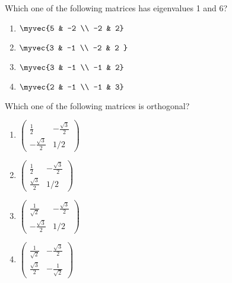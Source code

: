 \item Which one of the following matrices has eigenvalues 1 and 6? \hfill{}
\begin{multicols}{4}
\begin{enumerate}
\item $\myvec {5 & -2 \\ -2 & 2}$
\item $\myvec{3 & -1 \\ -2 & 2 }$
\item $\myvec{3 & -1 \\ -1 & 2}$
\item $\myvec{2 & -1 \\ -1 & 3}$
\end{enumerate}
\end{multicols}
\item Which one of the following matrices is orthogonal? \hfill{}
\begin{multicols}{4}
\begin{enumerate}
	\item $\begin{pmatrix} \frac{1}{2} & -\frac{\sqrt{3}}{2}  \\ -\frac{\sqrt{3}}{2} & 1/2 \end{pmatrix}$
	\item $\begin{pmatrix} \frac{1}{2} & -\frac{\sqrt{3}}{2} \\ \frac{\sqrt{3}}{2} & 1/2 \end{pmatrix}$
\item $\begin{pmatrix} \frac{1}{\sqrt{2}} & -\frac{\sqrt{3}}{2} \\ -\frac{\sqrt{3}}{2} & 1/2 \end{pmatrix}$
\item $\begin{pmatrix} \frac{1}{\sqrt{2}} & -\frac{\sqrt{3}}{2} \\ \frac{\sqrt{3}}{2} & -\frac{1}{\sqrt{2}} \end{pmatrix}$
\end{enumerate}
\end{multicols}
